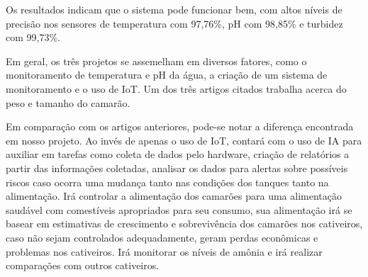 Os resultados indicam que o sistema pode funcionar bem, com altos níveis de precisão nos sensores de temperatura com 97,76\%, pH com 98,85\% e turbidez com 99,73\%.

Em geral, os três projetos se assemelham em diversos fatores, como o monitoramento de temperatura e pH da água, a criação de um sistema de monitoramento e o uso de IoT. Um dos três artigos citados trabalha acerca do peso e tamanho do camarão. 

Em comparação com os artigos anteriores, pode-se notar a diferença encontrada em nosso projeto. Ao invés de apenas o uso de IoT, contará com o uso de IA para auxiliar em tarefas como coleta de dados pelo hardware, criação de relatórios a partir das informações coletadas, analisar os dados para alertas sobre possíveis riscos caso ocorra uma mudança tanto nas condições dos tanques tanto na alimentação. Irá controlar a alimentação dos camarões para uma alimentação saudável com comestíveis apropriados para seu consumo, sua alimentação irá se basear em estimativas de crescimento e sobrevivência dos camarões nos cativeiros, caso não sejam controlados adequadamente, geram perdas econômicas e problemas nos cativeiros. Irá monitorar os níveis de amônia e irá realizar comparações com outros cativeiros.